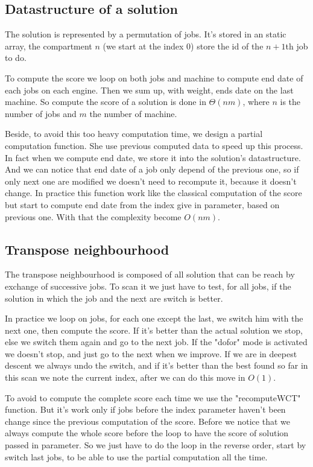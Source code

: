 \documentclass[12pt,a4paper]{article}
\begin{document}
\subsection{Datastructure of a solution}

The solution is represented by a permutation of jobs. It's stored in an static array, the compartment $n$ (we start at the index $0$) store the id of the $n+1$th job to do.

To compute the score we loop on both jobs and machine to compute end date of each jobs on each engine. Then we sum up, with weight, ends date on the last machine. So compute the score of a solution is done in $\Theta(nm)$, where $n$ is the number of jobs and $m$ the number of machine.

Beside, to avoid this too heavy computation time, we design a partial computation function. She use previous computed data to speed up this process. In fact when we compute end date, we store it into the solution's datastructure. And we can notice that end date of a job only depend of the previous one, so if only next one are modified we doesn't need to recompute it, because it doesn't change. In practice this function work like the classical computation of the score but start to compute end date from the index give in parameter, based on previous one. With that the complexity become $O(nm)$.

\subsection{Transpose neighbourhood}

The transpose neighbourhood is composed of all solution that can be reach by exchange of successive jobs. To scan it we just have to test, for all jobs, if the solution in which the job and the next are switch is better.

In practice we loop on jobs, for each one except the last, we switch him with the next one, then compute the score. If it's better than the actual solution we stop, else we switch them again and go to the next job. If the "dofor" mode is activated we doesn't stop, and just go to the next when we improve. If we are in deepest descent we always undo the switch, and if it's better than the best found so far in this scan we note the current index, after we can do this move in $O(1)$.

To avoid to compute the complete score each time we use the "recomputeWCT" function. But it's work only if jobs before the index parameter haven't been change since the previous computation of the score. Before we notice that we always compute the whole score before the loop to have the score of solution passed in parameter. So we just have to do the loop in the reverse order, start by switch last jobs, to be able to use the partial computation all the time.
\end{document}

